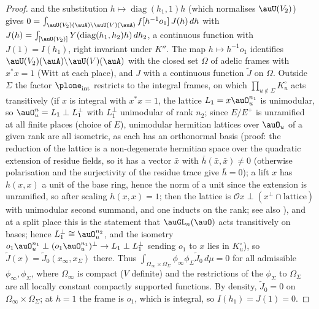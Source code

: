 \documentclass[10pt]{amsart}
\theoremstyle{definition}
\theoremstyle{remark}
\begin{document}
\begin{proof}
and the substitution $h\mapsto\operatorname{diag}(h_1,1)h$ (which normalises $\auU(V_2)$) gives
$0=\int_{\auU(V_2)(\auA)\backslash\auU(V)(\auA)}f[h^{-1}o_1]\,J(h)\,dh$ with
$J(h)=\int_{[\auU(V_2)]}Y(\operatorname{diag}(h_1,h_2)h)\,dh_2$, a continuous function with $J(1)=
I(h_1)$, right invariant under $K''$. The map $h\mapsto h^{-1}o_1$ identifies
$\auU(V_2)(\auA)\backslash\auU(V)(\auA)$ with the closed set $\Omega$ of adelic frames with $x^*x=1$
(Witt at each place), and $J$ with a continuous function $\tilde J$ on $\Omega$. Outside $\Sigma$
the factor $\plone_{\mathrm{int}}$ restricts to the integral frames, on which $\prod_{u\notin\Sigma}
K^\circ_u$ acts transitively (if $x$ is integral with $x^*x=1$, the lattice $L_1=x\auO_u^{n_1}$ is
unimodular, so $\auO_u^n=L_1\perp L_1^\perp$ with $L_1^\perp$ unimodular of rank $n_2$; since
$E/E^+$ is unramified at all finite places (choice of $E$), unimodular hermitian lattices over
$\auO_u$ of a given rank are all isometric, as each has an orthonormal basis (proof: the reduction of the lattice is a non-degenerate hermitian space over the quadratic extension of residue fields, so it has a vector $\bar x$ with $\bar h(\bar x,\bar x)\ne0$ (otherwise polarisation and the surjectivity of the residue trace give $\bar h=0$); a lift $x$ has $h(x,x)$ a unit of the base ring, hence the norm of a unit since the extension is unramified, so after scaling $h(x,x)=1$; then the lattice is $\mathcal O x\perp(x^\perp\cap\text{lattice})$ with unimodular second summand, and one inducts on the rank; see also \cite{Jacobowitz}), and at a split place this is the
statement that $\auGL_n(\auO)$ acts transitively on bases; hence $L_1^\perp\cong\auO_u^{n_2}$, and the
isometry $o_1\auO_u^{n_1}\perp(o_1\auO_u^{n_1})^\perp\to L_1\perp L_1^\perp$ sending $o_1$ to $x$ lies
in $K^\circ_u$), so $\tilde J(x)=\tilde J_0(x_\infty,x_\Sigma)$
there. Thus $\int_{\Omega_\infty\times\Omega_\Sigma}\phi_\infty\phi_\Sigma\tilde J_0\,d\mu=0$ for all
admissible $\phi_\infty,\phi_\Sigma$, where $\Omega_\infty$ is compact ($V$ definite) and the
restrictions of the $\phi_\Sigma$ to $\Omega_\Sigma$ are all locally constant compactly supported
functions. By density, $\tilde J_0=0$ on $\Omega_\infty\times\Omega_\Sigma$; at $h=1$ the frame is
$o_1$, which is integral, so $I(h_1)=J(1)=0$.
\end{proof}
\end{document}
